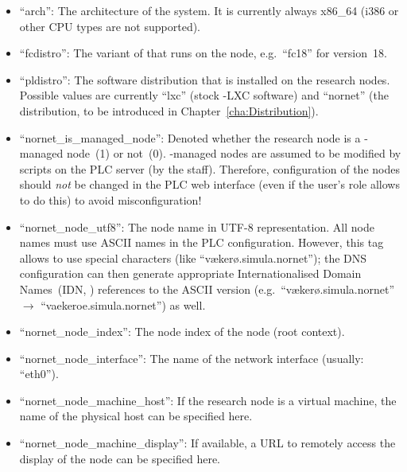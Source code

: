 \begin{itemize}
 \item ``arch'': The architecture of the system. It is currently always x86\_64 (i386 or other CPU types are not supported).

 \item ``fcdistro'': The variant of  that runs on the node, e.g.\ ``fc18'' for version~18.

 \item ``pldistro'': The software distribution that is installed on the research nodes. Possible values are currently ``lxc'' (stock -LXC software) and ``nornet'' (the  distribution, to be introduced in Chapter~\ref{cha:Distribution}).
 
 \item ``nornet\_is\_managed\_node'': Denoted whether the research node is a -managed node~(1) or not~(0). -managed nodes are assumed to be modified by scripts on the PLC server (by the  staff). Therefore, configuration of the nodes should \emph{not} be changed in the PLC web interface (even if the user's role allows to do this) to avoid misconfiguration!

 \item ``nornet\_node\_utf8'': The node name in UTF-8 representation. All node names must use ASCII names in the PLC configuration. However, this tag allows to use special characters (like ``vækerø.simula.nornet''); the DNS configuration can then generate appropriate Internationalised Domain Names~(IDN, \cite{RFC3492}) references to the ASCII version (e.g.\ ``vækerø.simula.nornet'' $\rightarrow$ ``vaekeroe.simula.nornet'') as well.
 
 \item ``nornet\_node\_index'': The node index of the node (root context).
 
 \item ``nornet\_node\_interface'': The name of the  network interface (usually: ``eth0'').
 
 \item ``nornet\_node\_machine\_host'': If the research node is a virtual machine, the name of the physical host can be specified here.
 
 \item ``nornet\_node\_machine\_display'': If available, a URL to remotely access the display of the node can be specified here.

 \end{itemize}


